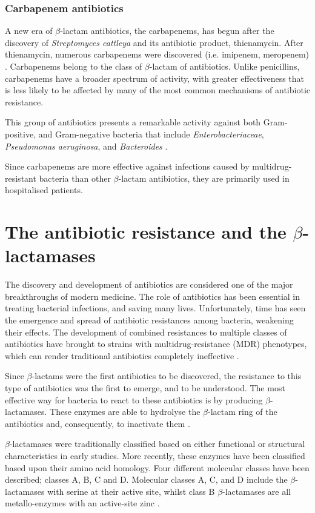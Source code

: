 \documentclass[11pt]{report}
\begin{document}
\subsection{Carbapenem antibiotics}
A new era of $\beta$-lactam antibiotics, the carbapenems, has begun after the discovery of \emph{Streptomyces cattleya} and its antibiotic product, thienamycin.
After thienamycin, numerous carbapenems were discovered (i.e. imipenem, meropenem) \cite{birnbaum1985}.
Carbapenems belong to the class of $\beta$-lactam of antibiotics.
Unlike penicillins, carbapenems have a broader spectrum of activity, with greater effectiveness that is less likely to be affected by many of the most common mechanisms of antibiotic resistance.

This group of antibiotics presents a remarkable activity against both Gram-positive, and Gram-negative bacteria that include \emph{Enterobacteriaceae}, \emph{Pseudomonas aeruginosa}, and \emph{Bacteroides} \cite{neu1985}.

Since carbapenems are more effective against infections caused by multidrug-resistant bacteria than other $\beta$-lactam antibiotics, they are primarily used in hospitalised patients.

\chapter{The antibiotic resistance and the $\beta$-lactamases}

The discovery and development of antibiotics are considered one of the major breakthroughs of modern medicine.
The role of antibiotics has been essential in treating bacterial infections, and saving many lives.
Unfortunately, time has seen the emergence and spread of antibiotic resistances among bacteria, weakening their effects.
The development of combined resistances to multiple classes of antibiotics have brought to strains with multidrug-resistance (MDR) phenotypes, which can render traditional antibiotics completely ineffective \cite{rossolini2014}.

Since $\beta$-lactams were the first antibiotics to be discovered, the resistance to this type of antibiotics was the first to emerge, and to be understood.
The most effective way for bacteria to react to these antibiotics is by producing $\beta$-lactamases.
These enzymes are able to hydrolyse the $\beta$-lactam ring of the antibiotics and, consequently, to inactivate them \cite{kong2010beta}.

$\beta$-lactamases were traditionally classified based on either functional or structural characteristics in early studies.
More recently, these enzymes have been classified based upon their amino acid homology.
Four different molecular classes have been described; classes A, B, C and D.
Molecular classes A, C, and D include the $\beta$-lactamases with serine at their active site, whilst class B $\beta$-lactamases are all metallo-enzymes with an active-site zinc \cite{queenan2007}.
\end{document}

